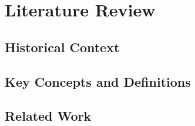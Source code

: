 \section{Literature Review}

\lipsum[1]

\subsection{Historical Context}

\lipsum[2]

\subsection{Key Concepts and Definitions}

\lipsum[3]

\subsection{Related Work}

\lipsum[4]
